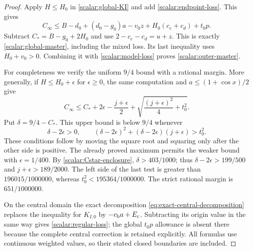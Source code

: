 \begin{proof}
Apply $H\leq H_0$ in \eqref{scalar:global-KI} and add
\eqref{scalar:endpoint-loss}.  This gives
\[
 C_\infty\leq B-d_0+(d_0-g_0)a-v_0z
                      +H_0(c_e+c_d)+t_0p.
\]
Subtract $C_*=B-g_0+2H_0$ and use
$2-c_e-c_d=u+z$.  This is exactly
\eqref{scalar:global-master}, including the mixed loss.  Its last
inequality uses $H_0+v_0>0$.
Combining it with \eqref{scalar:model-loss} proves
\eqref{scalar:outer-master}.

For completeness we verify the uniform $9/4$ bound with a rational
margin.  More generally, if $H\leq H_0+\epsilon$ for
$\epsilon\geq0$, the same computation and
$a\leq(1+\cos x)/2$ give
\[
 C_\infty\leq C_*+2\epsilon-
 \frac{j+\epsilon}{2}
       +\sqrt{\frac{(j+\epsilon)^2}{4}+t_0^2}.
\]
Put $\delta=9/4-C_*$.  This upper bound is below $9/4$ whenever
\[
 \delta-2\epsilon>0,\qquad
 (\delta-2\epsilon)^2+(\delta-2\epsilon)(j+\epsilon)>t_0^2.
\]
These conditions follow by moving the square root and squaring only
after the other side is positive.  The already proved maximum permits
the weaker bound with $\epsilon=1/400$.  By
\eqref{scalar:Cstar-enclosure}, $\delta>403/1000$; thus
$\delta-2\epsilon>199/500$ and $j+\epsilon>189/2000$.
The left side of the last test is greater than
$196015/1000000$, whereas $t_0^2<195364/1000000$.
The strict rational margin is $651/1000000$.

On the central domain the exact decomposition
\eqref{eq:exact-central-decomposition} replaces the inequality for
$K_{I,0}$ by $-c_{\rm b}a+E_c$.  Subtracting its origin value in
the same way gives \eqref{scalar:regular-loss}; the global $t_0p$
allowance is absent there because the complete central correction is
retained explicitly.  All formulas use continuous weighted values,
so their stated closed boundaries are included.
\end{proof}
